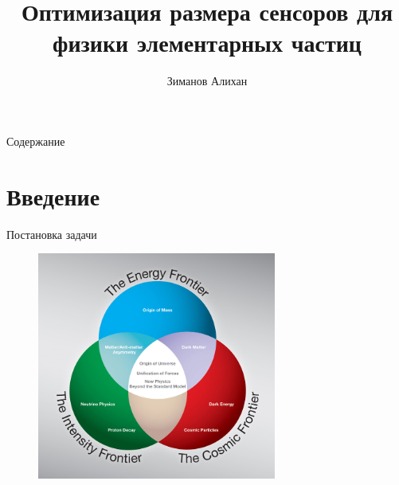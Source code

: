 \documentclass[9pt]{beamer}
\title[\textbf{}]{Оптимизация размера сенсоров для физики элементарных частиц} %
\author[\textbf{Зиманов Алихан}]
{Зиманов Алихан} %
\institute[\textbf{ВШЭ}] %
{Исследовательский проект\\
ВКР %
}
\begin{document}
{
\beamertemplatenavigationsymbolsempty
\begin{frame}[plain]
\titlepage
\end{frame}
}

{
\beamertemplatenavigationsymbolsempty
{}
{ }
\begin{frame}{Содержание} 
\tableofcontents 
\end{frame} 
}

\addtocounter{framenumber}{-2}

\section{Введение}

\begin{frame}{Постановка задачи}
    \begin{figure}
        \centering
        \includegraphics[width=0.7\textwidth]{images/high_energy_physics.jpg}
    \end{figure}
\end{frame}
\end{document}
